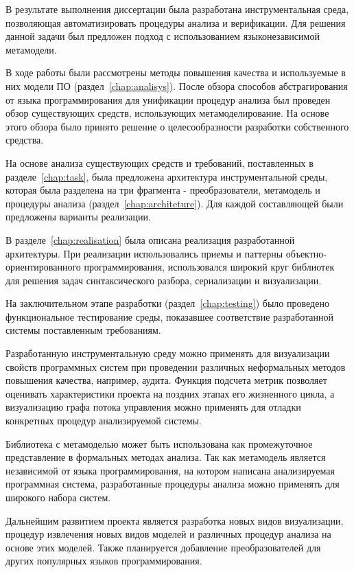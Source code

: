 \conclusion

В результате выполнения диссертации была разработана инструментальная среда,
позволяющая автоматизировать процедуры анализа и верификации. Для решения данной
задачи был предложен подход с использованием языконезависимой метамодели.

В ходе работы были рассмотрены методы повышения качества и используемые в них
модели ПО (раздел~\ref{chap:analisys}). После обзора способов абстрагирования от
языка программирования для унификации процедур анализа был проведен обзор
существующих средств, использующих метамоделирование. На основе этого обзора
было принято решение о целесообразности разработки собственного средства.

На основе анализа существующих средств и требований, поставленных в
разделе~\ref{chap:task}, была предложена архитектура инструментальной среды,
которая была разделена на три фрагмента - преобразователи, метамодель и
процедуры анализа (раздел~\ref{chap:architeture}). Для каждой составляющей были
предложены варианты реализации.

В разделе~\ref{chap:realisation} была описана реализация разработанной
архитектуры. При реализации использовались приемы и паттерны объектно-
ориентированного программирования, использовался широкий круг библиотек для
решения задач синтаксического разбора, сериализации и визуализации.

На заключительном этапе разработки (раздел~\ref{chap:testing}) было проведено
функциональное тестирование среды, показавшее соответствие разработанной системы
поставленным требованиям.

Разработанную инструментальную среду можно применять для визуализации свойств
программных систем при проведении различных неформальных методов повышения
качества, например, аудита. Функция подсчета метрик позволяет оценивать
характеристики проекта на поздних этапах его жизненного цикла, а визуализацию
графа потока управления можно применять для отладки конкретных процедур
анализируемой системы.

Библиотека с метамоделью может быть использована как промежуточное представление
в формальных методах анализа. Так как метамодель является независимой от языка
программирования, на котором написана анализируемая программная система,
разработанные процедуры анализа можно применять для широкого набора систем.

Дальнейшим развитием проекта является разработка новых видов визуализации,
процедур извлечения новых видов моделей и различных процедур анализа на
основе этих моделей. Также планируется добавление преобразователей для других
популярных языков программирования.
